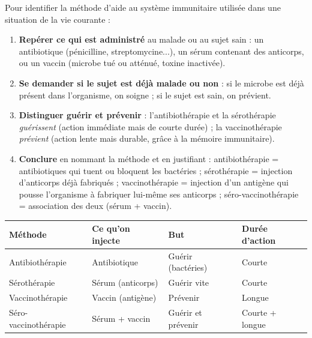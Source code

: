 \documentclass[11pt]{article}
\begin{document}
\begin{methode}
Pour identifier la méthode d'aide au système immunitaire utilisée dans une situation de la vie courante :
\begin{enumerate}
\item \textbf{Repérer ce qui est administré} au malade ou au sujet sain : un antibiotique (pénicilline, streptomycine...), un sérum contenant des anticorps, ou un vaccin (microbe tué ou atténué, toxine inactivée).
\item \textbf{Se demander si le sujet est déjà malade ou non} : si le microbe est déjà présent dans l'organisme, on soigne ; si le sujet est sain, on prévient.
\item \textbf{Distinguer guérir et prévenir} : l'antibiothérapie et la sérothérapie \emph{guérissent} (action immédiate mais de courte durée) ; la vaccinothérapie \emph{prévient} (action lente mais durable, grâce à la mémoire immunitaire).
\item \textbf{Conclure} en nommant la méthode et en justifiant : antibiothérapie = antibiotiques qui tuent ou bloquent les bactéries ; sérothérapie = injection d'anticorps déjà fabriqués ; vaccinothérapie = injection d'un antigène qui pousse l'organisme à fabriquer lui-même ses anticorps ; séro-vaccinothérapie = association des deux (sérum + vaccin).
\end{enumerate}
\begin{center}
\begin{tabularx}{\linewidth}{|l|X|X|X|}
\hline
\rowcolor{popblueL} \textbf{Méthode} & \textbf{Ce qu'on injecte} & \textbf{But} & \textbf{Durée d'action} \\
\hline
Antibiothérapie & Antibiotique & Guérir (bactéries) & Courte \\
\hline
Sérothérapie & Sérum (anticorps) & Guérir vite & Courte \\
\hline
Vaccinothérapie & Vaccin (antigène) & Prévenir & Longue \\
\hline
Séro-vaccinothérapie & Sérum + vaccin & Guérir et prévenir & Courte + longue \\
\hline
\end{tabularx}
\end{center}
\end{methode}
\end{document}
